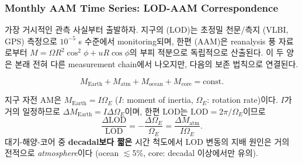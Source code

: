 

\subsubsection{Monthly AAM Time Series: LOD-AAM Correspondence}

가장 거시적인 관측 사실부터 출발하자.  지구의  (LOD)는
초정밀 천문/측지 (VLBI, GPS) 측정으로 $10^{-5}$ s 수준에서 monitoring되며,
한편  (AAM)은 reanalysis 풍 자료로부터
$M = \Omega R^2\cos^2\phi + uR\cos\phi$의 부피 적분으로 독립적으로 산출된다.
이 두 양은 본래 전혀 다른 measurement chain에서 나오지만, 다음의 보존 법칙으로
연결된다.

\begin{equation}\label{eq:ch07_temp_lod_aam}
  M_{\text{Earth}} + M_{\text{atm}} + M_{\text{ocean}} + M_{\text{core}}
    = \text{const.}
\end{equation}


\begin{remark}
지구 자전 AM은 $M_{\text{Earth}} = I\Omega_E$ ($I$: moment of inertia,
$\Omega_E$: rotation rate)이다.  $I$가 거의 일정하므로
$\Delta M_{\text{Earth}} = I\Delta\Omega_E$이며, 한편 LOD는
$\text{LOD} = 2\pi/\Omega_E$이므로
\begin{equation}\label{eq:ch07_temp_dlod}
  \frac{\Delta \text{LOD}}{\text{LOD}} = -\frac{\Delta\Omega_E}{\Omega_E}
    = \frac{\Delta M_{\text{atm}}}{I\Omega_E}.
\end{equation}
대기-해양-코어 중 \textbf{decadal보다 짧은} 시간 척도에서 LOD 변동의
지배 원인은 거의 전적으로 \emph{atmosphere}이다 (ocean $\lesssim$5\%,
core: decadal 이상에서만 유의).
\end{remark}



